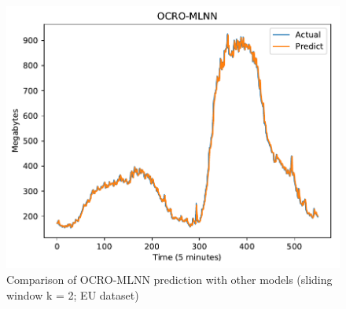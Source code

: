 \documentclass[review,3p,authoryear]{elsarticle}
\begin{document}
{\begin{figure}[!ht]
\begin{minipage}[b]{0.33\linewidth}
    \includegraphics[width=0.9\linewidth]{images/pdf/predict/k2/eu_k2_ocro_mlnn.pdf} 
  \end{minipage} 
  
  \caption{Comparison of OCRO-MLNN prediction with other models (sliding window k = 2; EU dataset)} 
  \label{predict_eu_sliding2} 
\end{figure}




}
\end{document}
